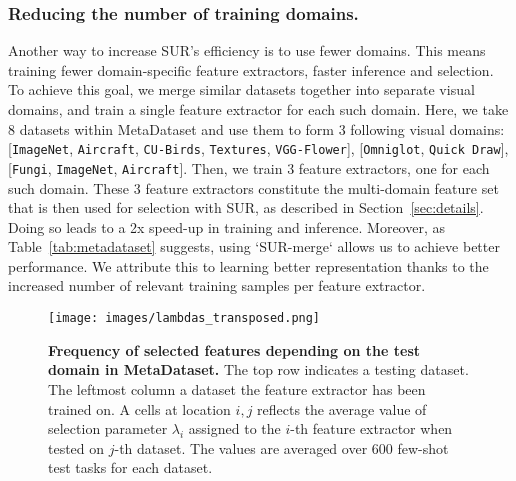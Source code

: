 \documentclass[runningheads]{llncs}
\begin{document}
\subsubsection{Reducing the number of training domains.}
Another way to increase SUR's efficiency is to use fewer domains. This means
training fewer domain-specific feature extractors, faster inference and
selection. To achieve this goal, we merge similar datasets together into
separate visual domains, and train a single feature extractor for each such
domain. Here, we take 8 datasets within MetaDataset and use them to form 3
following visual domains: [\texttt{ImageNet}, \texttt{Aircraft},
  \texttt{CU-Birds}, \texttt{Textures}, \texttt{VGG-Flower}],
[\texttt{Omniglot}, \texttt{Quick Draw}], [\texttt{Fungi}, \texttt{ImageNet},
  \texttt{Aircraft}]. Then, we train 3 feature extractors, one for each such
domain. These 3 feature extractors constitute the multi-domain feature set that
is then used for selection with SUR, as described in Section~\ref{sec:details}.
Doing so leads to a 2x speed-up in training and inference. Moreover, as Table~\ref{tab:metadataset} suggests, using
`SUR-merge` allows us to achieve better performance. We attribute
this to learning better representation thanks to the increased number of
relevant training samples per feature extractor.

\begin{figure}[t!]
\begin{center}
  \texttt{[image: images/lambdas\_transposed.png]}
\end{center}
\caption{\textbf{Frequency of selected features depending on the test domain in MetaDataset.}
  The top row indicates a testing dataset. The leftmost column a dataset the
  feature extractor has been trained on. A cells at location $i, j$ reflects
  the average value of selection parameter $\lambda_i$ assigned to the $i$-th feature
  extractor when tested on $j$-th dataset. The values are averaged over 600
  few-shot test tasks for each dataset.}
\label{fig:lambdas}
\end{figure}
\end{document}
